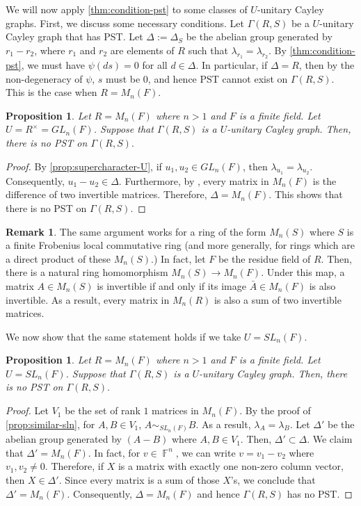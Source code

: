 \documentclass[12pt, a4paper]{amsart}
\newtheorem{prop}[thm]{Proposition}
\theoremstyle{definition}
\newtheorem{rem}[thm]{Remark}
\DeclareMathOperator{\F}{\mathbb{F}}
\numberwithin{equation}{section}
\begin{document}
We will now apply \cref{thm:condition-pst} to some classes of $U$-unitary Cayley graphs. First, we discuss some necessary conditions. Let $\Gamma(R,S)$ be a $U$-unitary Cayley graph that has PST. Let $\Delta := \Delta_{S}$ be the abelian group generated by $r_1 - r_2$, where $r_1$ and $r_2$ are elements of $R$ such that $\lambda_{r_1} = \lambda_{r_2}$. By \cref{thm:condition-pst}, we must have $\psi(ds) = 0$ for all $d \in \Delta$. In particular, if $\Delta = R$, then by the non-degeneracy of $\psi$, $s$ must be $0$, and hence PST cannot exist on $\Gamma(R,S)$. This is the case when $R = M_n(F)$.




\begin{prop} \label{prop:pst-matrix-gl-n}
    Let $R=M_n(F)$ where $n>1$ and $F$ is a finite field. Let $U=R^{\times}= GL_n(F)$. Suppose that $\Gamma(R,S)$ is a $U$-unitary Cayley graph. Then, there is no PST on $\Gamma(R,S).$
\end{prop}

\begin{proof}
    By \cref{prop:supercharacter-U}, if $u_1, u_2 \in GL_n(F)$, then $\lambda_{u_1} =\lambda_{u_2}.$ Consequently, $u_1-u_2 \in \Delta.$ Furthermore, by \cite{invertible_matrices}, every matrix in $M_n(F)$ is the difference of two invertible matrices. Therefore, $\Delta=M_n(F).$ This shows that there is no PST on $\Gamma(R,S).$
\end{proof}
\begin{rem}
    The same argument works for a ring of the form $M_n(S)$ where $S$ is a finite Frobenius local commutative ring (and more generally, for rings which are a direct product of these $M_n(S)$.) In fact, let $F$ be the residue field of $R$.
 Then, there is a natural ring homomorphism $M_n(S) \to M_n(F).$ Under this map, a matrix $A \in M_n(S)$ is invertible if and only if its image $\bar{A} \in M_n(F)$ is also invertible. As a result, every matrix in $M_n(R)$ is also a sum of two invertible matrices. 
 \end{rem}

We now show that the same statement holds if we take $U=SL_n(F).$
 
\begin{prop} \label{prop:pst-matrix-sl-n}
    Let $R=M_n(F)$ where $n>1$ and $F$ is a finite field. Let $U=SL_n(F)$. Suppose that $\Gamma(R,S)$ is a $U$-unitary Cayley graph. Then, there is no PST on $\Gamma(R,S).$
\end{prop}

\begin{proof}
    Let $V_1$ be the set of rank $1$ matrices in $M_n(F)$. By the proof of \cref{prop:similar-sln}, for $A,B \in V_1$, $A \sim_{SL_n(F)} B.$ As a result, $\lambda_{A}=\lambda_{B}.$ Let $\Delta'$ be the abelian group generated by $(A-B)$ where $A, B \in V_1.$ Then, $\Delta' \subset \Delta.$ We claim that $\Delta'=M_n(F).$ In fact, for $v \in \F^n$, we can write $v=v_1-v_2$ where $v_1, v_2 \neq 0.$ Therefore, if $X$ is a matrix with exactly one non-zero column vector, then $X \in \Delta'.$ Since every matrix is a sum of those $X$'s, we conclude that $\Delta'=M_n(F).$ Consequently, $\Delta= M_n(F)$ and hence $\Gamma(R,S)$ has no PST. 
\end{proof}
\end{document}
